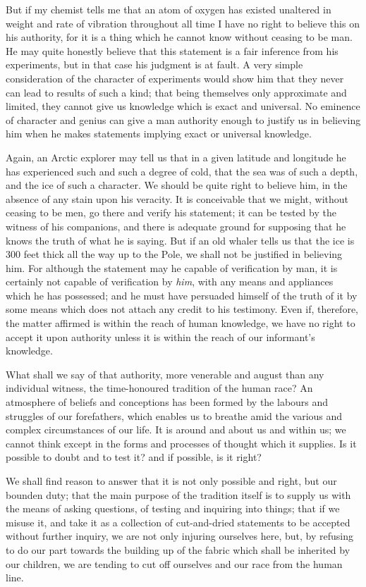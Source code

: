 \documentclass[12pt]{article}
\begin{document}
But if my chemist tells me that an atom of oxygen has existed unaltered in weight and rate of vibration throughout all time I have no right to believe this on his authority, for it is a thing which he cannot know without ceasing to be man. He may quite honestly believe that this statement is a fair inference from his experiments, but in that case his judgment is at fault. A very simple consideration of the character of experiments would show him that they never can lead to results of such a kind; that being themselves only approximate and limited, they cannot give us knowledge which is exact and universal. No eminence of character and genius can give a man authority enough to justify us in believing him when he makes statements implying exact or universal knowledge.

Again, an Arctic explorer may tell us that in a given latitude and longitude he has experienced such and such a degree of cold, that the sea was of such a depth, and the ice of such a character. We should be quite right to believe him, in the absence of any stain upon his veracity. It is conceivable that we might, without ceasing to be men, go there and verify his statement; it can be tested by the witness of his companions, and there is adequate ground for supposing that he knows the truth of what he is saying. But if an old whaler tells us that the ice is 300 feet thick all the way up to the Pole, we shall not be justified in believing him. For although the statement may he capable of verification by man, it is certainly not capable of verification by \emph{him},  with any means and appliances which he has possessed; and he must have persuaded himself of the truth of it by some means which does not attach any credit to his testimony. Even if, therefore, the matter affirmed is within the reach of human knowledge, we have no right to accept it upon authority unless it is within the reach of our informant's knowledge.

What shall we say of that authority, more venerable and august than any individual witness, the time-honoured tradition of the human race? An atmosphere of beliefs and conceptions has been formed by the labours and struggles of our forefathers, which enables us to breathe amid the various and complex circumstances of our life. It is around and about us and within us; we cannot think except in the forms and processes of thought which it supplies. Is it possible to doubt and to test it? and if possible, is it right?

We shall find reason to answer that it is not only possible and right, but our bounden duty; that the main purpose of the tradition itself is to supply us with the means of asking questions, of testing and inquiring into things; that if we misuse it, and take it as a collection of cut-and-dried statements to be accepted without further inquiry, we are not only injuring ourselves here, but, by refusing to do our part towards the building up of the fabric which shall be inherited by our children, we are tending to cut off ourselves and our race from the human line.
\end{document}
